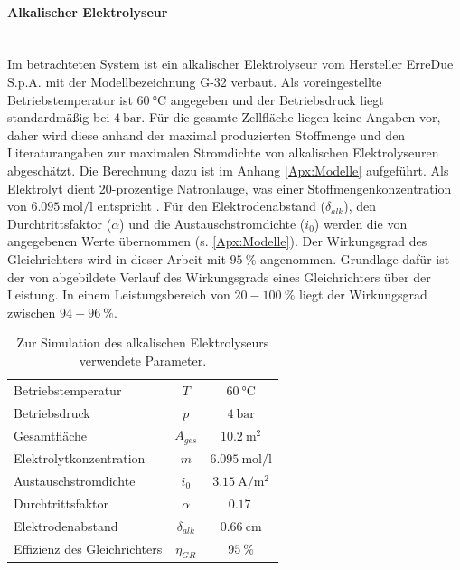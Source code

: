 \paragraph{Alkalischer Elektrolyseur}\ \\
Im betrachteten System ist ein alkalischer Elektrolyseur vom Hersteller ErreDue S.p.A. mit der Modellbezeichnung G-32 verbaut. Als voreingestellte Betriebstemperatur ist $\SI{60}{\degreeCelsius}$ angegeben und der Betriebsdruck liegt standardmäßig bei $\SI{4}{\bar}$.
Für die gesamte Zellfläche liegen keine Angaben vor, daher wird diese anhand der maximal produzierten Stoffmenge und den Literaturangaben zur maximalen Stromdichte von alkalischen Elektrolyseuren abgeschätzt. Die Berechnung dazu ist im Anhang \ref{Apx:Modelle} aufgeführt. Als Elektrolyt dient 20-prozentige Natronlauge, was einer Stoffmengenkonzentration von $\SI{6,095}{\mol\per\l}$ entspricht \citep{periodensystem-online_dichtewerttabelle_nodate-1}.
Für den Elektrodenabstand ($\delta_{alk}$), den Durchtrittsfaktor ($\alpha$) und die Austauschstromdichte ($i_0$) werden die von \citet{milewski_modeling_2014} angegebenen Werte übernommen (s. \ref{Apx:Modelle}). 
Der Wirkungsgrad des Gleichrichters wird in dieser Arbeit mit $\SI{95}{\%}$ angenommen. Grundlage dafür ist der von \citet[S.~50]{tjarks_pem-elektrolyse-systeme_2017} abgebildete Verlauf des Wirkungsgrads eines Gleichrichters über der Leistung. In einem Leistungsbereich von $20-\SI{100}{\%}$ liegt der Wirkungsgrad zwischen $94-\SI{96}{\%}$.

\begin{table}[htb]
		\centering
		\caption{Zur Simulation des alkalischen Elektrolyseurs verwendete Parameter.}
		\begin{tabular}{l c c}
		\toprule
		Betriebstemperatur & $T$ & $\SI{60}{\degreeCelsius}$\\
		Betriebsdruck & $p$ & $\SI{4}{\bar}$\\
		Gesamtfläche & $A_{ges}$ & $\SI{10,2}{\m\squared }$\\
		Elektrolytkonzentration & $m$ & $\SI{6,095}{\mol \per \l}$\\
		Austauschstromdichte & $i_0$ & $ \SI{3,15}{\A\per\m\squared}$\\
		Durchtrittsfaktor & $\alpha$ & $\SI{0,17}{}$\\
		Elektrodenabstand & $\delta_{alk}$ & $\SI{0,66}{\cm}$\\
		Effizienz des Gleichrichters & $\eta_{GR}$ & $\SI{95}{\%}$ \\
		\bottomrule
		\end{tabular}
		\label{tb:ParameterElektrolyseur}
\end{table}	

